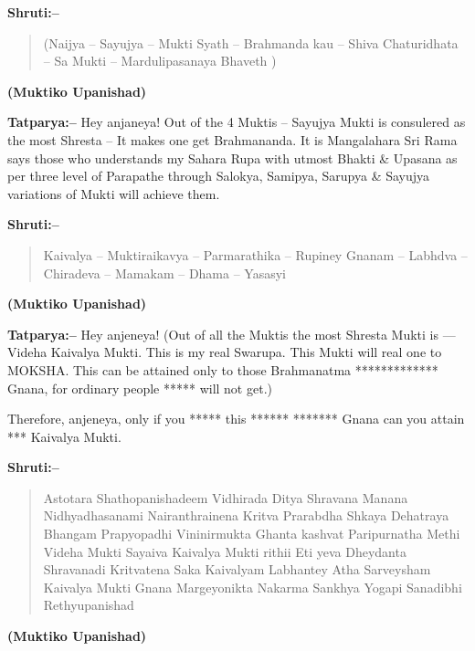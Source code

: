 \textbf{Shruti:–}

\begin{verse}
(Naijya – Sayujya – Mukti Syath – Brahmanda kau – Shiva Chaturidhata – Sa Mukti – Mardulipasanaya Bhaveth )
\end{verse}

\begin{flushright}
\textbf{(Muktiko Upanishad)}
\end{flushright}

\textbf{Tatparya:–} Hey anjaneya! Out of the 4 Muktis – Sayujya Mukti is consulered as the most Shresta – It makes one get Brahmananda. It is Mangalahara Sri Rama says those who understands my Sahara Rupa with utmost Bhakti \& Upasana as per three level of Parapathe through Salokya, Samipya, Sarupya \& Sayujya variations of Mukti will achieve them.

\textbf{Shruti:–}

\begin{verse}
Kaivalya – Muktiraikavya – Parmarathika – Rupiney  Gnanam – Labhdva – Chiradeva – Mamakam – Dhama – Yasasyi 
\end{verse}

\begin{flushright}
\textbf{(Muktiko Upanishad)}
\end{flushright}

\textbf{Tatparya:–} Hey anjeneya! (Out of all the Muktis the most Shresta Mukti is — Videha Kaivalya Mukti. This is my real Swarupa. This Mukti will real one to MOKSHA. This can be attained only to those Brahmanatma ************* Gnana, for ordinary people ***** will not get.)

Therefore, anjeneya, only if you ***** this ****** ******* Gnana can you attain *** Kaivalya Mukti.

\textbf{Shruti:–}

\begin{verse}
Astotara Shathopanishadeem Vidhirada Ditya Shravana Manana Nidhyadhasanami Nairanthrainena Kritva  Prarabdha Shkaya Dehatraya Bhangam Prapyopadhi Vininirmukta Ghanta kashvat Paripurnatha Methi Videha Mukti Sayaiva Kaivalya Mukti rithii  Eti yeva Dheydanta Shravanadi Kritvatena Saka Kaivalyam Labhantey  Atha Sarveysham Kaivalya Mukti Gnana Margeyonikta Nakarma Sankhya Yogapi Sanadibhi Rethyupanishad 
\end{verse}

\begin{flushright}
\textbf{(Muktiko Upanishad)}
\end{flushright}

